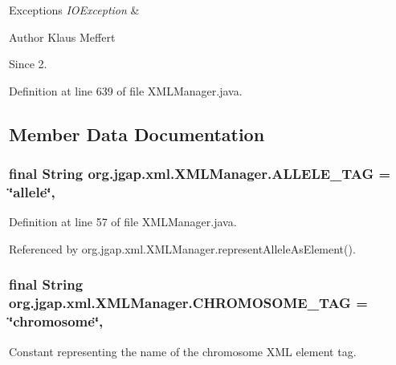 \begin{DoxyExceptions}{Exceptions}
{\em I\-O\-Exception} & \\
\hline
\end{DoxyExceptions}
\begin{DoxyAuthor}{Author}
Klaus Meffert 
\end{DoxyAuthor}
\begin{DoxySince}{Since}
2. 
\end{DoxySince}


Definition at line 639 of file X\-M\-L\-Manager.\-java.



\subsection{Member Data Documentation}
\hypertarget{classorg_1_1jgap_1_1xml_1_1_x_m_l_manager_a69a54996f8e2e16cbadffe808f28afa1}{
\subsubsection[{A\-L\-L\-E\-L\-E\-\_\-\-T\-A\-G}]{\setlength{\rightskip}{0pt plus 5cm}final String org.\-jgap.\-xml.\-X\-M\-L\-Manager.\-A\-L\-L\-E\-L\-E\-\_\-\-T\-A\-G = \char`\"{}allele\char`\"{}\hspace{0.3cm}{\ttfamily [static]}, {\ttfamily [private]}}}\label{classorg_1_1jgap_1_1xml_1_1_x_m_l_manager_a69a54996f8e2e16cbadffe808f28afa1}


Definition at line 57 of file X\-M\-L\-Manager.\-java.



Referenced by org.\-jgap.\-xml.\-X\-M\-L\-Manager.\-represent\-Allele\-As\-Element().

\hypertarget{classorg_1_1jgap_1_1xml_1_1_x_m_l_manager_a5bce59b72a6ba0a315bc7be777b48647}{
\subsubsection[{C\-H\-R\-O\-M\-O\-S\-O\-M\-E\-\_\-\-T\-A\-G}]{\setlength{\rightskip}{0pt plus 5cm}final String org.\-jgap.\-xml.\-X\-M\-L\-Manager.\-C\-H\-R\-O\-M\-O\-S\-O\-M\-E\-\_\-\-T\-A\-G = \char`\"{}chromosome\char`\"{}\hspace{0.3cm}{\ttfamily [static]}, {\ttfamily [private]}}}\label{classorg_1_1jgap_1_1xml_1_1_x_m_l_manager_a5bce59b72a6ba0a315bc7be777b48647}
Constant representing the name of the chromosome X\-M\-L element tag. 

